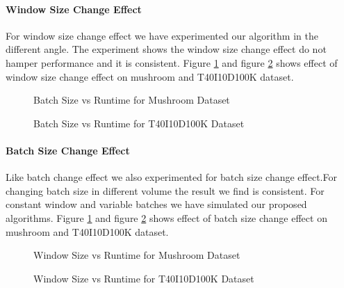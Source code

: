     \paragraph{Window Size Change Effect}For window size change effect we have experimented our algorithm in the different angle. The experiment shows the window size change effect do not hamper performance and it is consistent. Figure \ref{result:g_m_const_batch} and figure \ref{result:g_t10_const_batch} shows effect of window size change effect on mushroom and T40I10D100K dataset.
        \begin{figure}[h]
        \centering
            
        \caption{Batch Size vs Runtime for Mushroom Dataset }
        \label{result:g_m_const_batch}
        \end{figure}
        \begin{figure}[h]
        \centering
            
        \caption{Batch Size vs Runtime for T40I10D100K Dataset }
        \label{result:g_t10_const_batch}
        \end{figure}
    \paragraph{Batch Size Change Effect}Like batch change effect we also experimented for batch size change effect.For changing batch size in different volume the result we find is consistent. For constant window and variable batches we have simulated our proposed algorithms. Figure \ref{result:g_m_const_batch} and figure \ref{result:g_t10_const_batch} shows effect of batch size change effect on mushroom and T40I10D100K dataset.
        \begin{figure}[h]
        \centering
            
        \caption{Window Size vs Runtime for Mushroom Dataset }
        \label{result:g_m_const_win}
        \end{figure}
        \begin{figure}[h]
        \centering
            
        \caption{Window Size vs Runtime for T40I10D100K Dataset }
        \label{result:g_t10_const_win}
        \end{figure}
\clearpage
